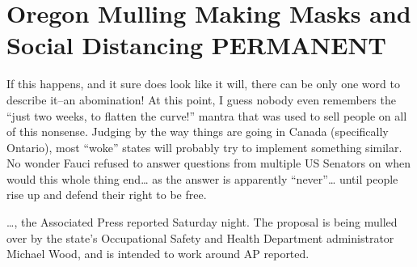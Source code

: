 \chapter{Oregon Mulling Making Masks and Social Distancing PERMANENT}

\begin{refsection}

If this happens, and it sure does look like it will, there can be only one word to describe it--an abomination! At this point, I guess nobody even remembers the \enquote{just two weeks, to flatten the curve!} mantra that was used to sell people on all of this nonsense. Judging by the way things are going in Canada (specifically Ontario), most \enquote{woke} states will probably try to implement something similar. No wonder Fauci refused to answer questions from multiple US Senators on when would this whole thing end\dots{} as the answer is apparently \enquote{never}\dots{} until people rise up and defend their right to be free.


\begin{tcolorbox}[quote]

\dots{}, the Associated Press\textsuperscript{\cite{url17a30fac}} reported Saturday night. The proposal is being mulled over by the state's Occupational Safety and Health Department administrator Michael Wood, and is intended to work around  AP reported.\textsuperscript{\cite{url9sdayh22}}

\end{tcolorbox}

\printbibliography[heading=subbibliography]

\end{refsection}